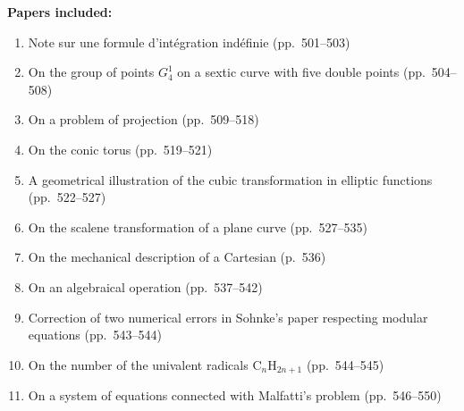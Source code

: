 \documentclass[11pt,a4paper]{article}
\theoremstyle{plain}
\theoremstyle{definition}
\theoremstyle{remark}
\begin{document}
\noindent\textbf{Papers included:}
\begin{enumerate}
\item[\textbf{[612]}] Note sur une formule d'int\'{e}gration ind\'{e}finie (pp.~501--503)
\item[\textbf{[613]}] On the group of points $G_4^1$ on a sextic curve with five double points (pp.~504--508)
\item[\textbf{[614]}] On a problem of projection (pp.~509--518)
\item[\textbf{[615]}] On the conic torus (pp.~519--521)
\item[\textbf{[616]}] A geometrical illustration of the cubic transformation in elliptic functions (pp.~522--527)
\item[\textbf{[617]}] On the scalene transformation of a plane curve (pp.~527--535)
\item[\textbf{[618]}] On the mechanical description of a Cartesian (p.~536)
\item[\textbf{[619]}] On an algebraical operation (pp.~537--542)
\item[\textbf{[620]}] Correction of two numerical errors in Sohnke's paper respecting modular equations (pp.~543--544)
\item[\textbf{[621]}] On the number of the univalent radicals C$_n$H$_{2n+1}$ (pp.~544--545)
\item[\textbf{[622]}] On a system of equations connected with Malfatti's problem (pp.~546--550)
\end{enumerate}
\end{document}
